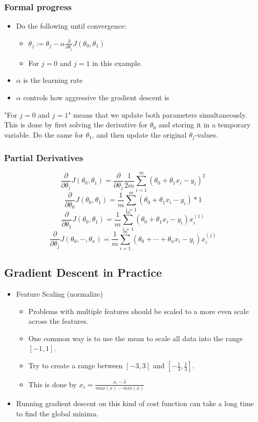 \subsubsection{Formal progress}
\begin{itemize}
    \item Do the following until convergence:
    \begin{itemize}
        \item $\theta_j:=\theta_j-\alpha\frac{\partial}{\partial\theta_j}J(\theta_0, \theta_1)$
        \item For $j=0$ and $j=1$ in this example.
    \end{itemize}
    \item $\alpha$ is the learning rate
    \item $\alpha$ controls how aggressive the gradient descent is
\end{itemize}

"For $j=0$ and $j=1$" means that we update both parameters simultaneously. This is done by first solving the derivative for $\theta_0$ and storing it in a temporary variable. Do the same for $\theta_1$, and then update the original $\theta_j$-values.

\subsubsection{Partial Derivatives}
\[
    \frac{\partial}{\partial \theta_j}J(\theta_0, \theta_1) = \frac{\partial}{\partial\theta_j}\frac{1}{2m}\sum_{i=1}^m(\theta_0+\theta_1x_i-y_i)^2
\]
\[
    \frac{\partial}{\partial \theta_0}J(\theta_0, \theta_1) = \frac{1}{m}\sum_{i=1}^m(\theta_0+\theta_1x_i-y_i)*1
\]
\[
    \frac{\partial}{\partial \theta_1}J(\theta_0, \theta_1) = \frac{1}{m}\sum_{i=1}^m(\theta_0+\theta_1x_i-y_i)x_i^{(1)}
\]
\[
    \frac{\partial}{\partial \theta_j}J(\theta_0, \cdots, \theta_n) = \frac{1}{m}\sum_{i=1}^m(\theta_0+\cdots+\theta_nx_i-y_i)x_i^{(j)}
\]

\subsection{Gradient Descent in Practice}
\begin{itemize}
    \item Feature Scaling (normalize)
    \begin{itemize}
        \item Problems with multiple features should be scaled to a more even scale across the features.
        \item One common way is to use the mean to scale all data into the range $\left[-1, 1\right]$.
        \item Try to create a range between $\left[-3, 3\right]$ and $\left[-\frac{1}{3}, \frac{1}{3}\right]$.
        \item This is done by $x_i = \frac{x_i-\hat{x}}{max(x)-min(x)}$
    \end{itemize}
    \item Running gradient descent on this kind of cost function can take a long time to find the global minima.
\end{itemize}

